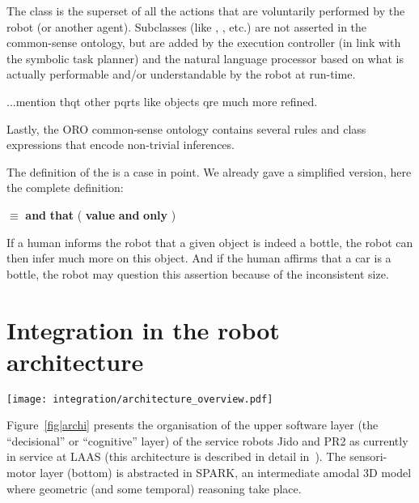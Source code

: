 The class  is the superset of all the actions that
are voluntarily performed by the robot (or another agent). Subclasses (like
, , etc.) are not asserted in the common-sense
ontology, but are added by the execution controller (in link with the symbolic
task planner) and the natural language processor based on what is actually
performable and/or understandable by the robot at run-time.

...mention thqt other pqrts like objects qre much more refined.

Lastly, the ORO common-sense ontology contains several rules and class
expressions that encode non-trivial inferences.

The definition of the  is a case in point. We already gave a
simplified version, here the complete definition:

 $\equiv$  {\bf and} 
{\bf that} ( {\bf value}  {\bf and}
 {\bf only} )

If a human informs the robot that a given object is indeed a bottle, the robot
can then infer much more on this object. And if the human affirms that a car is
a bottle, the robot may question this assertion because of the inconsistent
size.

\section{Integration in the robot architecture}
\label{sect|integration}

\begin{figure*}[thpb]
  \centering
  \texttt{[image: integration/architecture\_overview.pdf]}

  \caption {Software architecture of PR2 and Jido, two service robot
  interacting with humans at LAAS-CNRS.}

  \label{fig|archi}
\end{figure*}

Figure~\ref{fig|archi} presents the organisation of the upper software layer
(the ``decisional'' or ``cognitive'' layer) of the service robots Jido and PR2
as currently in service at LAAS (this architecture is described in detail
in~\cite{Alami2011}). The sensori-motor layer (bottom) is abstracted in SPARK,
an intermediate amodal 3D model where geometric (and some temporal) reasoning
take place.

